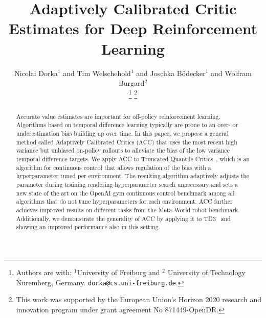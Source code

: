 \documentclass[letterpaper, 10 pt, conference]{ieeeconf}  %
\title{\LARGE \bf
Adaptively Calibrated Critic Estimates for Deep Reinforcement Learning
}
\author{Nicolai Dorka$^{1}$ and Tim Welschehold$^{1}$ and Joschka Bödecker$^{1}$ and Wolfram Burgard$^{2}$%

\thanks{Authors are with: $^{1}$University of Freiburg and $^{2}$ University of Technology Nuremberg, Germany.
        {\tt\small dorka@cs.uni-freiburg.de}.}%
\thanks{This work was supported by the European Union’s Horizon 2020 research and innovation program under grant agreement No 871449-OpenDR.}%
        }
\begin{document}
\maketitle
\thispagestyle{empty}
\pagestyle{empty}


\begin{abstract}

Accurate value estimates are important for off-policy reinforcement learning. 
Algorithms based on temporal difference learning typically are prone to an over- or underestimation bias building up over time.
In this paper, we propose a general method called Adaptively Calibrated Critics (ACC) that uses the most recent high variance but unbiased on-policy rollouts to alleviate the bias of the low variance temporal difference targets.
We apply ACC to Truncated Quantile Critics~\cite{tqc}, which is an algorithm for continuous control that allows regulation of the bias with a hyperparameter tuned per environment.
The resulting algorithm adaptively adjusts the parameter during training rendering hyperparameter search unnecessary 
and sets a new state of the art on the OpenAI gym continuous control benchmark among all algorithms
that do not tune hyperparameters for each environment.
ACC further achieves improved results on different tasks from the Meta-World robot benchmark.
Additionally, we demonstrate the generality of ACC by applying it to TD3~\cite{td3} and showing an improved performance also in this setting. 
\end{abstract}














% 





\end{document}
